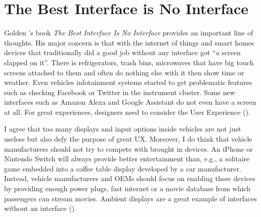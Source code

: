 \section {The Best Interface is No Interface}
\label{sec:nointerface}
Golden \citeauthor{krishna2015best}'s book \emph{The Best Interface Is No Interface} \citeyear{krishna2015best}  provides an important line of thoughts. His major concern is that with the internet of things and smart homes devices that traditionally did a good job without any interface got “a screen slapped on it”. There is refrigerators, trash bins, microwaves that have big touch screens attached to them and often do nothing else with it then show time or weather. Even vehicles infotainment systems started to get problematic features such as checking Facebook or Twitter in the instrument cluster. Some new interfaces such as Amazon Alexa and Google Assistant do not even have a screen at all. For great experiences, designers need to consider the User Experience (\emph{}). 
 
I agree that too many displays and input options inside vehicles are not just useless but also defy the purpose of great UX. Moreover, I do think that vehicle manufacturers should not try to compete with brought in devices. An iPhone or Nintendo Switch will always provide better entertainment than, e.g., a solitaire game embedded into a coffee table display developed by a car manufacturer. Instead, vehicle manufacturers and OEMs should focus on enabling these devices by providing enough power plugs, fast internet or a movie database from which passengers can stream movies. Ambient displays are a great example of interfaces without an interface (\emph{}). 
